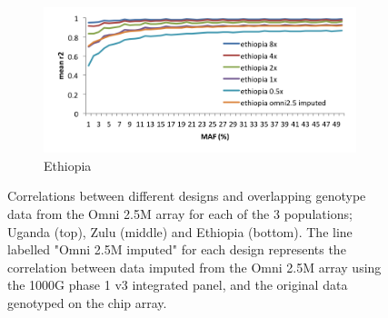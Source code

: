 \begin{figure}
        \begin{subfigure}[b]{0.75\textwidth}
                \includegraphics[width=\textwidth]{fig/SN12f5c}
                \caption{Ethiopia}
                \label{fig:ethiopia}
        \end{subfigure}
        \caption[Correlation with imputed chip data and sequence data after downsampling to lower coverage.]{Correlations between different designs and overlapping genotype data from the Omni 2.5M array for each of the 3 populations; Uganda (top), Zulu (middle) and Ethiopia (bottom). The line labelled "Omni 2.5M imputed" for each design represents the correlation between data imputed from the Omni 2.5M array using the \gls{1000G} phase 1 v3 integrated panel, and the original data genotyped on the chip array.}
        \label{fig:SN12f5}
\end{figure}